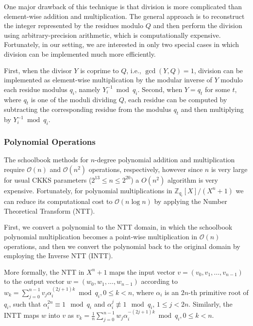 One major drawback of this technique is that division is more complicated than element-wise addition and multiplication. The general approach is to reconstruct the integer represented by the residues modulo \(Q\) and then perform the division using arbitrary-precision arithmetic, which is computationally expensive. Fortunately, in our setting, we are interested in only two special cases in which division can be implemented much more efficiently.

First, when the divisor \(Y\) is coprime to \(Q\), i.e., \(\gcd(Y,Q)=1\), division can be implemented as element-wise multiplication by the modular inverse of \(Y\) modulo each residue modulus \(q_i\), namely \(Y_i^{-1} \bmod q_i\). Second, when \(Y=q_t\) for some \(t\), where \(q_t\) is one of the moduli dividing \(Q\), each residue can be computed by subtracting the corresponding residue from the modulus \(q_t\) and then multiplying by \(Y_i^{-1} \bmod q_i\).

\subsubsection{Polynomial Operations}
\label{ckks:ops}

The schoolbook methods for $n$-degree polynomial addition and multiplication require $\mathcal{O}(n)$ and $\mathcal{O}(n^2)$ operations, respectively, however since $n$ is very large for usual CKKS parameters ($2^{13} \leq n \leq 2^{20}$) a $O(n^2)$ algorithm is very expensive. Fortunately, for polynomial multiplications in $\mathbb{Z}_{q_i}[X]/(X^n+1)$ we can reduce its computational cost to $\mathcal{O}(n \log n)$ by applying the Number Theoretical Transform (NTT).

First, we convert a polynomial to the NTT domain, in which the schoolbook polynomial multiplication becomes a point-wise multiplication in $\mathcal{O}(n)$ operations, and then we convert the polynomial back to the original domain by employing the Inverse NTT (INTT). %

More formally, the NTT in $X^n+1$ maps the input vector $v = (v_0, v_1, \ldots, v_{n-1})$ to the output vector $w = (w_0, w_1, \ldots, w_{n-1})$ according to  $w_k = \sum^{n-1}_{j=0}v_j\alpha_i^{(2j+1)k} \bmod q_i, 0 \leq k < n$, where $\alpha_i$ is an $2n$-th primitive root of $q_i$, such that $\alpha_i^{2n} \equiv 1 \mod q_i$ and $\alpha^j_i \not\equiv 1 \mod q_i$, $1 \leq j < 2n$. Similarly, the INTT maps $w$ into $v$ as $v_k = \frac{1}{n} \sum^{n-1}_{j=0}w_j\alpha_i^{-(2j+1)k} \bmod q_i, 0 \leq k < n$.

